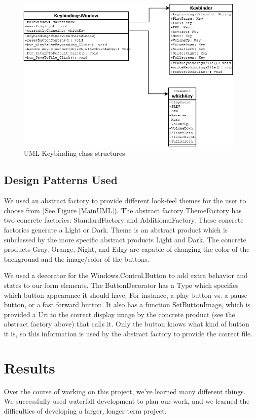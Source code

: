\documentclass[10pt,conference,onecolumn,compsoc]{IEEEtran}
\begin{document}
\begin{figure}[H]
\begin{center}
\includegraphics[scale=0.4]{Keybinder.png}
\caption{UML Keybinding class structures}
\label{KeybinderUML}
\end{center}
\end{figure}

\subsection{Design Patterns Used}
We used an abstract factory to provide different look-feel themes for the user to choose from (See Figure \ref{MainUML}). The abstract factory ThemeFactory has two concrete factories: StandardFactory and AdditionalFactory. These concrete factories generate a Light or Dark. Theme is an abstract product which is subclassed by the more specific abstract products Light and Dark. The concrete products Gray, Orange, Night, and Edgy are capable of changing the color of the background and the image/color of the buttons. \medskip

We used a decorator for the Windows.Control.Button to add extra behavior and states to our form elements. The ButtonDecorator has a Type which specifies which button appearance it should have. For instance, a play button vs. a pause button, or a fast forward button. It also has a function SetButtonImage, which is provided a Uri to the correct display image by the concrete product (see the abstract factory above) that calls it. Only the button knows what kind of button it is, so this information is used by the abstract factory to provide the correct file.


\section{Results}
Over the course of working on this project, we've learned many different things. We successfully used waterfall development to plan our work, and we learned the difficulties of developing a larger, longer term project. \par
\end{document}
